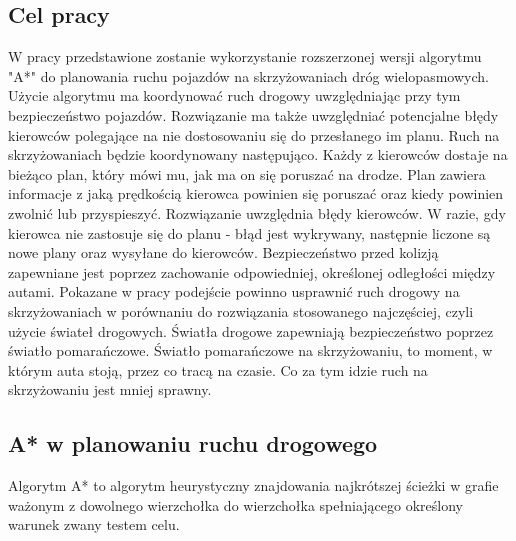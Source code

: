 \documentclass[../main.tex]{subfiles}
\begin{document}
 
\begin{figure}[bh]
\centering
 
\end{figure}

\subsection{Cel pracy}

  W pracy przedstawione zostanie wykorzystanie rozszerzonej wersji algorytmu "A*" do planowania ruchu pojazdów na skrzyżowaniach dróg wielopasmowych. Użycie algorytmu ma koordynować ruch drogowy uwzględniając przy tym bezpieczeństwo pojazdów. Rozwiązanie ma także uwzględniać potencjalne błędy kierowców polegające na nie dostosowaniu się do przesłanego im planu.
  Ruch na skrzyżowaniach będzie koordynowany następująco. Każdy z kierowców dostaje na bieżąco plan, który mówi mu, jak ma on się poruszać na drodze. Plan zawiera informacje z jaką prędkością kierowca powinien się poruszać oraz kiedy powinien zwolnić lub przyspieszyć. Rozwiązanie uwzględnia błędy kierowców. W razie, gdy kierowca nie zastosuje się do planu - błąd jest wykrywany, następnie liczone są nowe plany oraz wysyłane do kierowców. Bezpieczeństwo przed kolizją zapewniane jest poprzez zachowanie odpowiedniej, określonej odległości między autami.
  Pokazane w pracy podejście powinno usprawnić ruch drogowy na skrzyżowaniach w porównaniu do rozwiązania stosowanego najczęściej, czyli użycie świateł drogowych. Światła drogowe zapewniają bezpieczeństwo poprzez światło pomarańczowe. Światło pomarańczowe na skrzyżowaniu, to moment, w którym auta stoją, przez co tracą na czasie. Co za tym idzie ruch na skrzyżowaniu jest mniej sprawny.

\subsection{A* w planowaniu ruchu drogowego}

  Algorytm A* to algorytm heurystyczny znajdowania najkrótszej ścieżki w grafie ważonym z dowolnego wierzchołka do wierzchołka spełniającego określony warunek zwany testem celu.  
\end{document}
